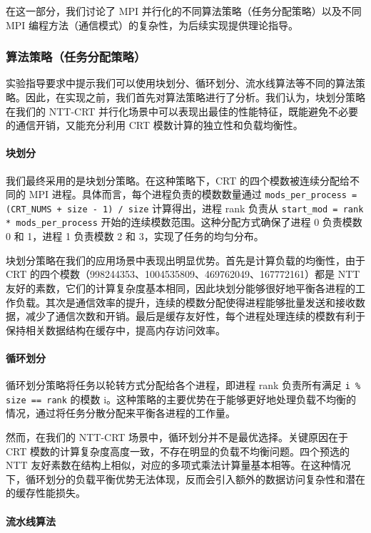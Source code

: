 \documentclass[a4paper]{article}
\begin{document}
在这一部分，我们讨论了 MPI 并行化的不同算法策略（任务分配策略）以及不同 MPI 编程方法（通信模式）的复杂性，为后续实现提供理论指导。

\subsubsection{算法策略（任务分配策略）}

实验指导要求中提示我们可以使用块划分、循环划分、流水线算法等不同的算法策略。因此，在实现之前，我们首先对算法策略进行了分析。我们认为，块划分策略在我们的 NTT-CRT 并行化场景中可以表现出最佳的性能特征，既能避免不必要的通信开销，又能充分利用 CRT 模数计算的独立性和负载均衡性。

\paragraph{块划分}

我们最终采用的是块划分策略。在这种策略下，CRT 的四个模数被连续分配给不同的 MPI 进程。具体而言，每个进程负责的模数数量通过 \texttt{mods\_per\_process = (CRT\_NUMS + size - 1) / size} 计算得出，进程 rank 负责从 \texttt{start\_mod = rank * mods\_per\_process} 开始的连续模数范围。这种分配方式确保了进程 0 负责模数 0 和 1，进程 1 负责模数 2 和 3，实现了任务的均匀分布。

块划分策略在我们的应用场景中表现出明显优势。首先是计算负载的均衡性，由于 CRT 的四个模数（998244353、1004535809、469762049、167772161）都是 NTT 友好的素数，它们的计算复杂度基本相同，因此块划分能够很好地平衡各进程的工作负载。其次是通信效率的提升，连续的模数分配使得进程能够批量发送和接收数据，减少了通信次数和开销。最后是缓存友好性，每个进程处理连续的模数有利于保持相关数据结构在缓存中，提高内存访问效率。

\paragraph{循环划分}

循环划分策略将任务以轮转方式分配给各个进程，即进程 rank 负责所有满足 \texttt{i \% size == rank} 的模数 i。这种策略的主要优势在于能够更好地处理负载不均衡的情况，通过将任务分散分配来平衡各进程的工作量。

然而，在我们的 NTT-CRT 场景中，循环划分并不是最优选择。关键原因在于 CRT 模数的计算复杂度高度一致，不存在明显的负载不均衡问题。四个预选的 NTT 友好素数在结构上相似，对应的多项式乘法计算量基本相等。在这种情况下，循环划分的负载平衡优势无法体现，反而会引入额外的数据访问复杂性和潜在的缓存性能损失。

\paragraph{流水线算法}
\end{document}
